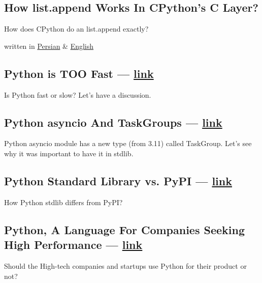 \begin{multicols}{2}
\subsection{{How list.append Works In CPython's C Layer?}}
\begin{zitemize}
\item How does CPython do an {\ttfamily list.append} exactly?
\item written in \href{https://virgool.io/@liewpl/how-append-works-gp4apwtpr0bt}{Persian}
\& \href{https://medium.com/@mahdihaghverdi/how-list-append-is-implemented-in-c-layer-of-cpython-interpreter-bf88632819c0}{English}
\end{zitemize}

\subsection{{Python is TOO Fast --- \href{https://virgool.io/@liewpl/python-is-very-fast-gmmdjs3zyhob}{link}}}
\begin{zitemize}
\item Is Python fast or slow? Let's have a discussion.
\end{zitemize}

\subsection{{Python asyncio And TaskGroups --- \href{https://virgool.io/@liewpl/asyncio-and-taskgroups-t598c8poken9}{link}}}
\begin{zitemize}
\item Python {\ttfamily asyncio} module has a new type (from 3.11) called {\ttfamily TaskGroup}. Let's see why it was important to have it in stdlib.
\end{zitemize}

\subsection{{Python Standard Library vs. PyPI --- \href{https://virgool.io/@liewpl/asyncio-and-taskgroups-t598c8poken9}{link}}}
\begin{zitemize}
\item How Python stdlib differs from PyPI?
\end{zitemize}

\subsection{{Python, A Language For Companies Seeking High Performance --- \href{https://vrgl.ir/29p56}{link}}}
\begin{zitemize}
\item Should the High-tech companies and startups use Python for their product or not?
\end{zitemize}


\end{multicols}
